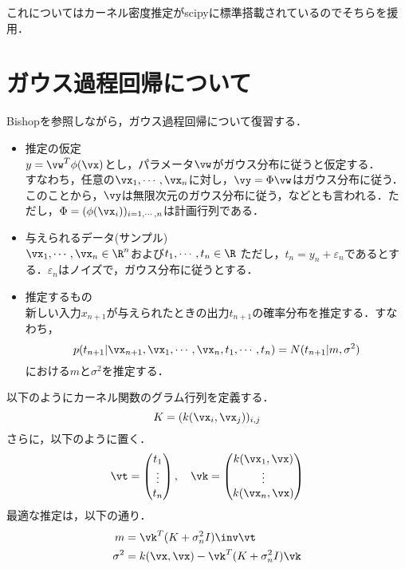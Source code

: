 \documentclass{jsarticle}
\begin{document}
これについてはカーネル密度推定がscipyに標準搭載されているのでそちらを援用．

\section{ガウス過程回帰について}

Bishopを参照\cite{bishop}しながら，ガウス過程回帰について復習する．


\begin{itemize}
 \item 推定の仮定\\
       $y=\vw^T\phi(\vx)$とし，パラメータ$\vw$がガウス分布に従うと仮定する．\\
       すなわち，任意の$\vx_1,\cdots,\vx_n$に対し，$\vy=\Phi\vw$はガウス分布に従う．このことから，$\vy$は無限次元のガウス分布に従う，などとも言われる．ただし，$\Phi=(\phi(\vx_i))_{i=1,\cdots,n}$は計画行列である．
 \item 与えられるデータ(サンプル)\\
       $\vx_1,\cdots,\vx_n\in\R^n$および$t_1,\cdots,t_n\in \R$
       ただし，$t_n=y_n+\varepsilon_n$であるとする．$\varepsilon_n$はノイズで，ガウス分布に従うとする．
 \item 推定するもの\\
       新しい入力$x_{n+1}$が与えられたときの出力$t_{n+1}$の確率分布を推定する．すなわち，
       \[
	p(t_{n+1}|\vx_{n+1},\vx_1,\cdots,\vx_n,t_1,\cdots,t_n)=N(t_{n+1}|m,\sigma^2)
       \]
       における$m$と$\sigma^2$を推定する．
\end{itemize}

\begin{thm}
 以下のようにカーネル関数のグラム行列を定義する．
 \[
  K=(k(\vx_i,\vx_j))_{i,j}
 \]
 さらに，以下のように置く．
 \[
  \vt=\begin{pmatrix}
       t_1\\\vdots\\t_n
      \end{pmatrix},\quad
 \vk=\begin{pmatrix}
	k(\vx_1,\vx)\\\vdots\\k(\vx_n,\vx)
     \end{pmatrix}
 \]
 最適な推定は，以下の通り．
 \begin{align*}
  m&=\vk^T(K+\sigma_n^2I)\inv \vt\\
  \sigma^2&=k(\vx,\vx)-\vk^T(K+\sigma_n^2I)\vk
 \end{align*}
\end{thm}
\end{document}
